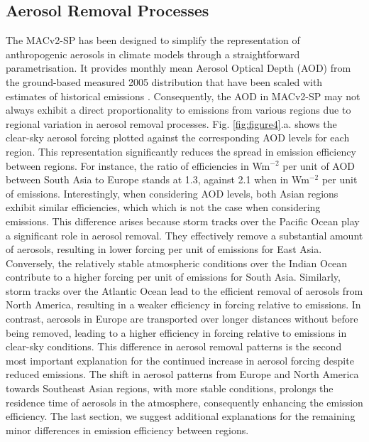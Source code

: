 \documentclass[draft]{agujournal2019}
\begin{document}
      \subsection{Aerosol Removal Processes}
            The MACv2-SP has been designed to simplify the representation of anthropogenic aerosols in climate models through a straightforward parametrisation. 
            It provides monthly mean Aerosol Optical Depth (AOD) from the ground-based measured 2005 distribution that have been scaled with estimates of historical emissions \cite{Stevens_2017}. 
            Consequently, the AOD in MACv2-SP may not always exhibit a direct proportionality to emissions from various regions due to regional variation in aerosol removal processes.
            Fig. \ref{fig:figure4}.a. shows the clear-sky aerosol forcing plotted against the corresponding AOD levels for each region. This representation significantly reduces the spread in emission efficiency between regions. For instance, the ratio of efficiencies in Wm$^{-2}$ per unit of AOD between South Asia to Europe stands at 1.3, against 2.1 when in Wm$^{-2}$ per unit of emissions. 
            Interestingly, when considering AOD levels, both Asian regions exhibit similar efficiencies, which which is not the case when considering emissions. This difference arises because storm tracks over the Pacific Ocean play a significant role in aerosol removal. They effectively remove a substantial amount of aerosols, resulting in lower forcing per unit of emissions for East Asia. Conversely, the relatively stable atmospheric conditions over the Indian Ocean contribute to a higher forcing per unit of emissions for South Asia.
            Similarly, storm tracks over the Atlantic Ocean lead to the efficient removal of aerosols from North America, resulting in a weaker efficiency in forcing relative to emissions. In contrast, aerosols in Europe are transported over longer distances without before being removed, leading to a higher efficiency in forcing relative to emissions in clear-sky conditions.
            This difference in aerosol removal patterns is the second most important explanation for the continued increase in aerosol forcing despite reduced emissions. The shift in aerosol patterns from Europe and North America towards Southeast Asian regions, with more stable conditions, prolongs the residence time of aerosols in the atmosphere, consequently enhancing the emission efficiency.
            The last section, we suggest additional explanations for the remaining minor differences in emission efficiency between regions.
\end{document}
